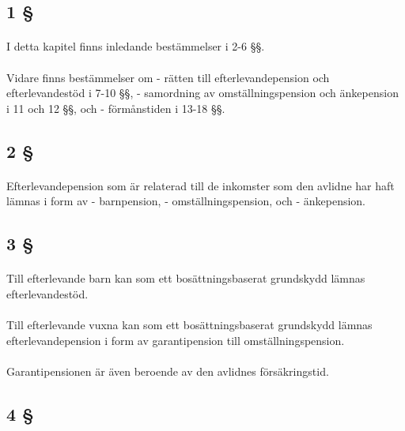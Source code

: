 \documentclass[a4paper,notitlepage,openany,10pt]{book}
\begin{document}
\subsection*{1 §}
\paragraph*{}
I detta kapitel finns inledande bestämmelser i 2-6 §§.
\paragraph*{}
Vidare finns bestämmelser om
\newline - rätten till efterlevandepension och efterlevandestöd i 7-10 §§,
\newline - samordning av omställningspension och änkepension i 11 och 12 §§, och
\newline - förmånstiden i 13-18 §§.
\subsection*{2 §}
\paragraph*{}
Efterlevandepension som är relaterad till de inkomster som den avlidne har haft lämnas i form av
\newline - barnpension,
\newline - omställningspension, och
\newline - änkepension.
\subsection*{3 §}
\paragraph*{}
Till efterlevande barn kan som ett bosättningsbaserat grundskydd lämnas efterlevandestöd.
\paragraph*{}
Till efterlevande vuxna kan som ett bosättningsbaserat grundskydd lämnas efterlevandepension i form av garantipension till omställningspension.
\paragraph*{}
Garantipensionen är även beroende av den avlidnes försäkringstid.
\subsection*{4 §}
\end{document}
